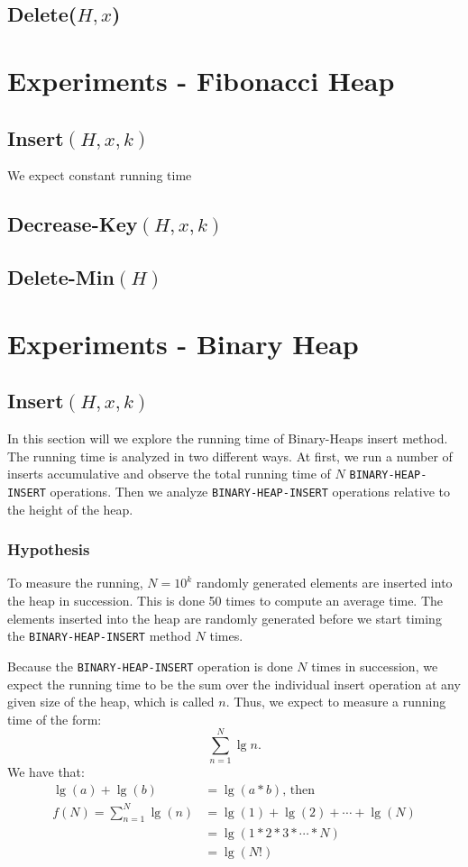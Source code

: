 \documentclass[a4paper,oneside,11pt]{article}
\begin{document}
\subsection*{Delete($H, x$)}

\section*{Experiments - Fibonacci Heap}
\subsection*{Insert$(H,x,k)$}
We expect constant running time 

\subsection*{Decrease-Key$(H,x,k)$}

\subsection*{Delete-Min$(H)$}

\section*{Experiments - Binary Heap}
\subsection*{Insert$(H,x,k)$}
In this section will we explore the running time of Binary-Heaps insert method. The running time is analyzed in two different ways. At first, we run a number of inserts accumulative and observe the total running time of $N$ \texttt{BINARY-HEAP-INSERT} operations. Then we analyze \texttt{BINARY-HEAP-INSERT} operations relative to the height of the heap.
\subsubsection*{Hypothesis}
To measure the running, $N=10^k$ randomly generated elements are inserted into the heap in succession. This is done 50 times to compute an average time. The elements inserted into the heap are randomly generated before we start timing the \texttt{BINARY-HEAP-INSERT} method $N$ times.

Because the \texttt{BINARY-HEAP-INSERT} operation is done $N$ times in succession, we expect the running time to be the sum over the individual insert operation at any given size of the heap, which is called $n$.
Thus, we expect to measure a running time of the form: \[\sum^N_{n=1}\lg n.\]
We have that:
\begin{align*}
  \lg(a)+\lg(b)&=\lg(a*b)\text{, then}\\
  f(N)=\sum^N_{n=1}\lg(n)&=\lg(1)+\lg(2)+\cdots+\lg(N)\\
  &=\lg(1*2*3*\cdots *N)\\
  &=\lg(N!)
\end{align*}
\end{document}
